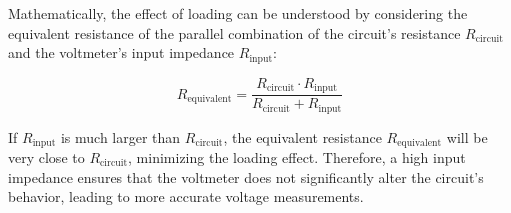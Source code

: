 Mathematically, the effect of loading can be understood by considering the equivalent resistance of the parallel combination of the circuit's resistance \( R_{\text{circuit}} \) and the voltmeter's input impedance \( R_{\text{input}} \):

\[
R_{\text{equivalent}} = \frac{R_{\text{circuit}} \cdot R_{\text{input}}}{R_{\text{circuit}} + R_{\text{input}}}
\]

If \( R_{\text{input}} \) is much larger than \( R_{\text{circuit}} \), the equivalent resistance \( R_{\text{equivalent}} \) will be very close to \( R_{\text{circuit}} \), minimizing the loading effect. Therefore, a high input impedance ensures that the voltmeter does not significantly alter the circuit's behavior, leading to more accurate voltage measurements.

